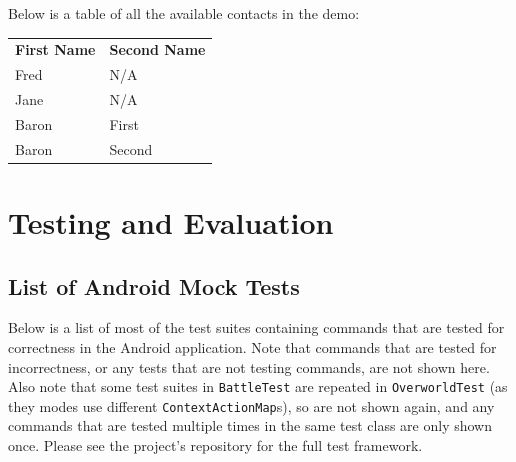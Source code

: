 \documentclass[11pt]{article}
\begin{document}
\begin{appendices}
Below is a table of all the available contacts in the demo:

\begin{table}[H]
\centering
\begin{tabular}{ll}
\textbf{First Name} & \textbf{Second Name} \\
Fred                & N/A                  \\
Jane                & N/A                  \\
Baron               & First                \\
Baron               & Second              
\end{tabular}
\end{table}

\newpage
\section{Testing and Evaluation}
\subsection{List of Android Mock Tests}
\label{appendix:mock-tests}

Below is a list of most of the test suites containing commands that are tested for correctness in the Android application. Note that commands that are tested for incorrectness, or any tests that are not testing commands, are not shown here. Also note that some test suites in \texttt{BattleTest} are repeated in \texttt{OverworldTest} (as they modes use different \texttt{ContextActionMap}s), so are not shown again, and any commands that are tested multiple times in the same test class are only shown once. Please see the project's repository for the full test framework.


\end{appendices}
\end{document}
